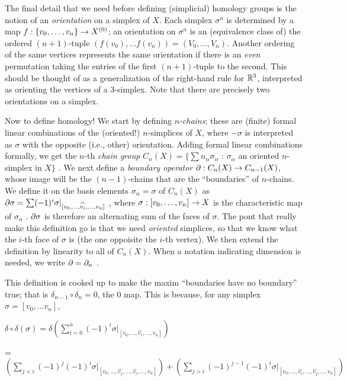 \msk

The final detail that we need before defining (simplicial) homology
groups is the notion of an {\it orientation} on a simplex of $X$.
Each simplex $\sigma^n$ is determined by a map 
$f:\{v_0,\ldots ,v_n\}\rightarrow X^{(0)}$; an orientation on $\sigma^n$ is an
(equivalence class of) the ordered $(n+1)$-tuple $(f(v_0),\ldots f(v_n)) = (V_0,\ldots ,V_n)$.
Another ordering of the
same vertices represents the same orientation if there is an {\it even} permutation
taking the entries of the first $(n+1)$-tuple to the second. This should be thought 
of as a generalization of the right-hand rule for ${\Bbb R}^3$, interpreted as
orienting the vertices of a 3-simplex. Note that there are precisely two
orientations on a simplex.

\msk

Now to define homology! We start by defining $n$-{\it chains};
these are (finite) formal linear combinations of the (oriented!) $n$-simplices
of $X$, where $-\sigma$ is interpreted as $\sigma$ with the opposite
(i.e., other) orientation. Adding formal linear combinations formally,
we get the $n$-th {\it chain group} 
$C_n(X) = \{\sum n_\alpha \sigma_\alpha$ : $\sigma_\alpha$ an oriented $n$-simplex in $X\}$ .
We next define a {\it boundary operator} $\partial:C_n(X)\rightarrow C_{n-1}(X)$, whose image will be 
the $(n-1)$-chains that are the ``boundaries'' of $n$-chains. We define it on the basis
elements $\sigma_\alpha = \sigma$ of $C_n(X)$ as
$\partial\sigma = \sum (-1)^i\sigma|_{[v_0,\ldots,\widehat{v_{i}},\ldots ,v_n]}$ , 
where $\sigma:[v_0,\ldots ,v_n]\rightarrow X$ is the characteristic map of $\sigma_\alpha$ .
$\partial\sigma$ is therefore an alternating sum of the faces of $\sigma$. 
The pont that really make this definition
go is that we need {\it oriented} simplices, so that we know what the $i$-th face
of $\sigma$ is (the one oppoisite the $i$-th vertex).
We then extend the definition by linearity to all of $C_n(X)$. When a notation indicating
dimension is needed, we write $\partial=\partial_n$ . 

\msk

This definition is cooked up to make the maxim ``boundaries have no boundary'' true;
that is $\delta_{n-1}\circ \delta_n = 0$, the $0$ map. This is because, for any simplex
$\sigma = [v_0,\ldots v_n]$, 

\msk

$\displaystyle \delta\circ\delta(\sigma) = 
\delta(\sum_{i=0}^n  (-1)^i\sigma|_{[v_0,\ldots,\widehat{v_{i}},\ldots ,v_n]})$

= $\displaystyle (\sum_{j<i}(-1)^j(-1)^i\sigma|_{[v_0,\ldots,\widehat{v_{j}},\ldots,\widehat{v_{i}},\ldots ,v_n]})
+(\sum_{j>i}(-1)^{j-1}(-1)^i\sigma|_{[v_0,\ldots,\widehat{v_{i}},\ldots,\widehat{v_{j}},\ldots ,v_n]})$

